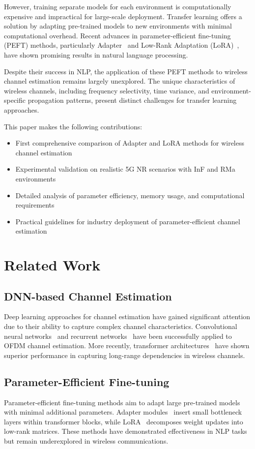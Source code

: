 \documentclass[conference]{IEEEtran}
\begin{document}
However, training separate models for each environment is computationally expensive and impractical for large-scale deployment. Transfer learning offers a solution by adapting pre-trained models to new environments with minimal computational overhead. Recent advances in parameter-efficient fine-tuning (PEFT) methods, particularly Adapter~\cite{houlsby2019parameter} and Low-Rank Adaptation (LoRA)~\cite{hu2021lora}, have shown promising results in natural language processing.

Despite their success in NLP, the application of these PEFT methods to wireless channel estimation remains largely unexplored. The unique characteristics of wireless channels, including frequency selectivity, time variance, and environment-specific propagation patterns, present distinct challenges for transfer learning approaches.

This paper makes the following contributions:
\begin{itemize}
\item First comprehensive comparison of Adapter and LoRA methods for wireless channel estimation
\item Experimental validation on realistic 5G NR scenarios with InF and RMa environments
\item Detailed analysis of parameter efficiency, memory usage, and computational requirements
\item Practical guidelines for industry deployment of parameter-efficient channel estimation
\end{itemize}

\section{Related Work}

\subsection{DNN-based Channel Estimation}
Deep learning approaches for channel estimation have gained significant attention due to their ability to capture complex channel characteristics. Convolutional neural networks~\cite{ye2018power} and recurrent networks~\cite{yang2020deep} have been successfully applied to OFDM channel estimation. More recently, transformer architectures~\cite{vaswani2017attention} have shown superior performance in capturing long-range dependencies in wireless channels.

\subsection{Parameter-Efficient Fine-tuning}
Parameter-efficient fine-tuning methods aim to adapt large pre-trained models with minimal additional parameters. Adapter modules~\cite{houlsby2019parameter} insert small bottleneck layers within transformer blocks, while LoRA~\cite{hu2021lora} decomposes weight updates into low-rank matrices. These methods have demonstrated effectiveness in NLP tasks but remain underexplored in wireless communications.
\end{document}
